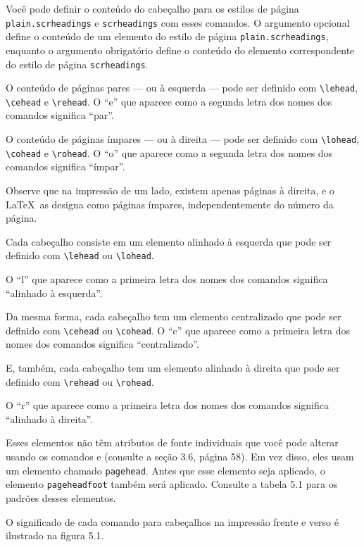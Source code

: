Você pode definir o conteúdo do cabeçalho para os estilos de página \texttt{plain.\-scr\-head\-ings} e \texttt{scr\-head\-ings} com esses comandos. O argumento opcional define o conteúdo de um elemento do estilo de página \texttt{plain.\-scr\-head\-ings}, enquanto o argumento obrigatório define o conteúdo do elemento correspondente do estilo de página \texttt{scr\-head\-ings}.

O conteúdo de páginas pares — ou à esquerda — pode ser definido com \verb|\lehead|, \verb|\cehead| e \verb|\rehead|. O “e” que aparece como a segunda letra dos nomes dos comandos significa “par”.

O conteúdo de páginas ímpares — ou à direita — pode ser definido com \verb|\lohead|, \verb|\cohead| e \verb|\rohead|. O “o” que aparece como a segunda letra dos nomes dos comandos significa “ímpar”.

Observe que na impressão de um lado, existem apenas páginas à direita, e o \LaTeX\ as designa como páginas ímpares, independentemente do número da página.

Cada cabeçalho consiste em um elemento alinhado à esquerda que pode ser definido com \verb|\lehead| ou \verb|\lohead|.

O “l” que aparece como a primeira letra dos nomes dos comandos significa “alinhado à esquerda”.

Da mesma forma, cada cabeçalho tem um elemento centralizado que pode ser definido com \verb|\cehead| ou \verb|\cohead|. O “c” que aparece como a primeira letra dos nomes dos comandos significa “centralizado”.

E, também, cada cabeçalho tem um elemento alinhado à direita que pode ser definido com \verb|\rehead| ou \verb|\rohead|.

O “r” que aparece como a primeira letra dos nomes dos comandos significa “alinhado à direita”.

Esses elementos não têm atributos de fonte individuais que você pode alterar usando os comandos  e  (consulte a seção 3.6, página 58). Em vez disso, eles usam um elemento chamado \texttt{page\-head}. Antes que esse elemento seja aplicado, o elemento \texttt{pa\-ge\-head\-foot} também será aplicado. Consulte a tabela 5.1 para os padrões desses elementos.

O significado de cada comando para cabeçalhos na impressão frente e verso é ilustrado na figura 5.1.

